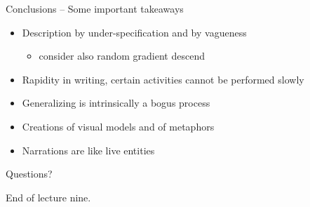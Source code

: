 \documentclass{beamer}
\begin{document}
\begin{frame}
{\centerline{Conclusions -- Some important takeaways}}
\begin{itemize}
\item Description by under-specification and by vagueness
\begin{itemize}
\item consider also random gradient descend
\end{itemize}  
\item Rapidity in writing, certain activities cannot be performed slowly
\item Generalizing is intrinsically a bogus process
\item Creations of visual models and of metaphors
\item Narrations are like live entities
\end{itemize}   
\end{frame}


\begin{frame}
{\centerline{Questions?}}

\vspace{1cm}
\begin{center}
    \LARGE{End of lecture nine.}
\end{center}

\end{frame}
\end{document}
